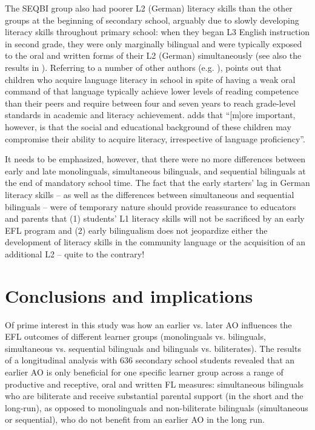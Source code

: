 \documentclass[output=paper,modfonts,nonflat,newtxmath]{langsci/langscibook}
\begin{document}
The SEQBI group also had poorer L2 (German) literacy skills than the other groups at the beginning of secondary school, arguably due to slowly developing literacy skills throughout primary school: when they began L3 English instruction in second grade, they were only marginally bilingual and were typically exposed to the oral and written forms of their L2 (German) simultaneously (see also the results in \citealt{SánchezBardel2017}). Referring to a number of other authors (e.g. \citealt{Collier1987, Cummins1991 , AugustHakuta1997}), \citet{Bialystok2007} points out that children who acquire language literacy in school in spite of having a weak oral command of that language typically achieve lower levels of reading competence than their peers and require between four and seven years to reach grade-level standards in academic and literacy achievement. \citet[22]{Bialystok2007} adds that “[m]ore important, however, is that the social and educational background of these children may compromise their ability to acquire literacy, irrespective of language proficiency”.

It needs to be emphasized, however, that there were no more differences between early and late monolinguals, simultaneous bilinguals, and sequential bilinguals at the end of mandatory school time. The fact that the early starters’ lag in German literacy skills – as well as the differences between simultaneous and sequential bilinguals – were of temporary nature should provide reassurance to educators and parents that (1) students’ L1 literacy skills will not be sacrificed by an early EFL program and (2) early bilingualism does not jeopardize either the development of literacy skills in the community language or the acquisition of an additional L2 – quite to the contrary!\\

\section{Conclusions and implications}
\label{sec:pfenninger:6}

Of prime interest in this study was how an earlier vs. later AO influences the EFL outcomes of different learner groups (monolinguals vs. bilinguals, simultaneous vs. sequential bilinguals and bilinguals vs. biliterates). The results of a longitudinal analysis with 636 secondary school students revealed that an earlier AO is only beneficial for one specific learner group across a range of productive and receptive, oral and written FL measures: simultaneous bilinguals who are biliterate and receive substantial parental support (in the short and the long-run), as opposed to monolinguals and non-biliterate bilinguals (simultaneous or sequential), who do not benefit from an earlier AO in the long run.
\end{document}
